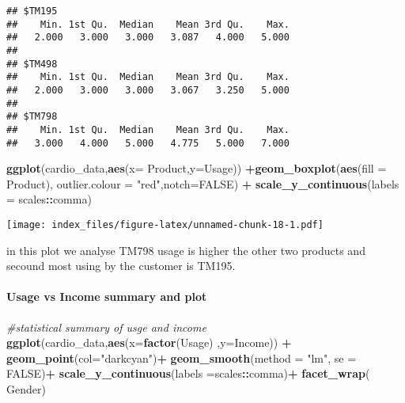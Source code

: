 \documentclass[
]{article}
\newenvironment{Shaded}{\begin{snugshade}}{\end{snugshade}}
\newcommand{\CommentTok}[1]{\textcolor[rgb]{0.56,0.35,0.01}{\textit{#1}}}
\newcommand{\DataTypeTok}[1]{\textcolor[rgb]{0.13,0.29,0.53}{#1}}
\newcommand{\KeywordTok}[1]{\textcolor[rgb]{0.13,0.29,0.53}{\textbf{#1}}}
\newcommand{\NormalTok}[1]{#1}
\newcommand{\OperatorTok}[1]{\textcolor[rgb]{0.81,0.36,0.00}{\textbf{#1}}}
\newcommand{\OtherTok}[1]{\textcolor[rgb]{0.56,0.35,0.01}{#1}}
\newcommand{\StringTok}[1]{\textcolor[rgb]{0.31,0.60,0.02}{#1}}
\begin{document}
\begin{verbatim}
## $TM195
##    Min. 1st Qu.  Median    Mean 3rd Qu.    Max. 
##   2.000   3.000   3.000   3.087   4.000   5.000 
## 
## $TM498
##    Min. 1st Qu.  Median    Mean 3rd Qu.    Max. 
##   2.000   3.000   3.000   3.067   3.250   5.000 
## 
## $TM798
##    Min. 1st Qu.  Median    Mean 3rd Qu.    Max. 
##   3.000   4.000   5.000   4.775   5.000   7.000
\end{verbatim}

\begin{Shaded}
\begin{Highlighting}[]
\KeywordTok{ggplot}\NormalTok{(cardio_data,}\KeywordTok{aes}\NormalTok{(}\DataTypeTok{x=}\NormalTok{ Product,}\DataTypeTok{y=}\NormalTok{Usage)) }\OperatorTok{+}\KeywordTok{geom_boxplot}\NormalTok{(}\KeywordTok{aes}\NormalTok{(}\DataTypeTok{fill =}\NormalTok{ Product), }\DataTypeTok{outlier.colour =} \StringTok{"red"}\NormalTok{,}\DataTypeTok{notch=}\OtherTok{FALSE}\NormalTok{) }\OperatorTok{+}\StringTok{ }\KeywordTok{scale_y_continuous}\NormalTok{(}\DataTypeTok{labels =}\NormalTok{ scales}\OperatorTok{::}\NormalTok{comma)}
\end{Highlighting}
\end{Shaded}

\texttt{[image: index\_files/figure-latex/unnamed-chunk-18-1.pdf]}

in this plot we analyse TM798 usage is higher the other two products and
secound most using by the customer is TM195.

\hypertarget{usage-vs-income-summary-and-plot}{%
\paragraph{Usage vs Income summary and
plot}\label{usage-vs-income-summary-and-plot}}

\begin{Shaded}
\begin{Highlighting}[]
\CommentTok{#statistical summary of usge and income}
\KeywordTok{ggplot}\NormalTok{(cardio_data,}\KeywordTok{aes}\NormalTok{(}\DataTypeTok{x=}\KeywordTok{factor}\NormalTok{(Usage) ,}\DataTypeTok{y=}\NormalTok{Income)) }\OperatorTok{+}
\StringTok{  }\KeywordTok{geom_point}\NormalTok{(}\DataTypeTok{col=}\StringTok{"darkcyan"}\NormalTok{)}\OperatorTok{+}
\StringTok{  }\KeywordTok{geom_smooth}\NormalTok{(}\DataTypeTok{method =} \StringTok{"lm"}\NormalTok{, }\DataTypeTok{se =} \OtherTok{FALSE}\NormalTok{)}\OperatorTok{+}
\StringTok{  }\KeywordTok{scale_y_continuous}\NormalTok{(}\DataTypeTok{labels =}\NormalTok{scales}\OperatorTok{::}\NormalTok{comma)}\OperatorTok{+}
\StringTok{  }\KeywordTok{facet_wrap}\NormalTok{(}\OperatorTok{~}\StringTok{ }\NormalTok{Gender)}
\end{Highlighting}
\end{Shaded}
\end{document}
